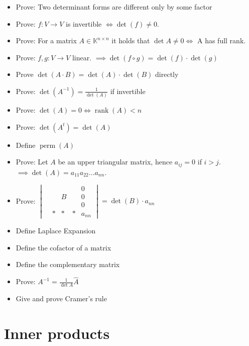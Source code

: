 \documentclass[a4paper]{article}
\DeclareMathOperator{\rank}{rank}
\begin{document}
\begin{itemize}
  \item Prove: Two determinant forms are different only by some factor
  \item Prove: $f: V \to V$ is invertible $\iff \det(f) \neq 0$.
  \item Prove: For a matrix $A \in \mathbb K^{n\times n}$ it holds that $\det{A} \neq 0 \iff$ A has full rank.
  \item Prove: $f, g: V \to V$ linear. $\implies \det(f \circ g) = \det(f) \cdot \det(g)$
  \item Prove $\det(A \cdot B) = \det(A) \cdot \det(B)$ directly
  \item Prove: $\det(A^{-1}) = \frac{1}{\det(A)}$ if invertible
  \item Prove: $\det(A) = 0 \iff \rank(A) < n$
  \item Prove: $\det(A^t) = \det(A)$
  \item Define $\operatorname{perm}(A)$
  \item Prove: Let $A$ be an upper triangular matrix, hence $a_{ij} = 0$ if $i > j$. $\implies \det(A) = a_{11} a_{22} \dots a_{nn}$.
  \item Prove: $\begin{vmatrix} &   &   &   & 0 \\ &   & B &   & 0 \\ &   &   &   & 0 \\ & * & * & * & a_{nn} \end{vmatrix} = \det(B) \cdot a_{nn}$
  \item Define Laplace Expansion
  \item Define the cofactor of a matrix
  \item Define the complementary matrix
  \item Prove: $A^{-1} = \frac{1}{\det{A}} \hat{A}$
  \item Give and prove Cramer's rule
\end{itemize}

\section{Inner products}
\end{document}
